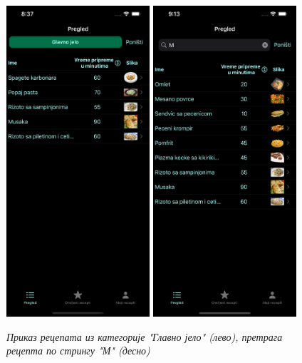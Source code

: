 \documentclass[12pt,oneside]{memoir}
\begin{document}
\begin{figure} [H]
    \centering
    \captionsetup{justification=centering}
    \includegraphics[width=0.475\textwidth]{images/simulators/testing images/choosen category.png}
    \hfill
    \includegraphics[width=0.475\textwidth]{images/simulators/testing images/search.png}
    \caption{\textit{Приказ рецепата из категорије "Главно јело" (лево), претрага рецепта по стрингу "М" (десно)}}
    \label{slika:приказ_избора_категорије_претраге_рецепата}
\end{figure}
\end{document}
